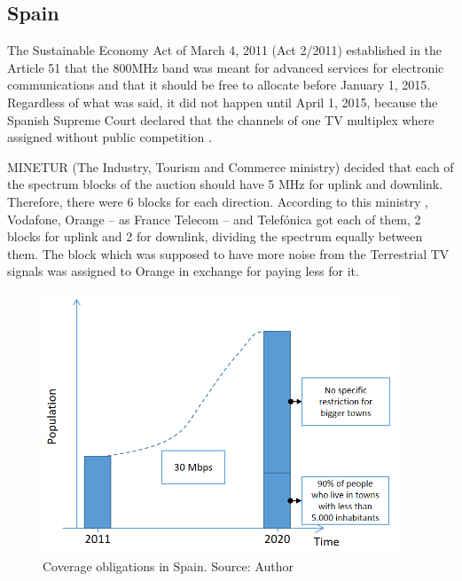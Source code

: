 {\subsection*{Spain}
The Sustainable Economy Act of March 4, 2011 (Act 2/2011) \cite{2-10} established in the Article 51 that the 800MHz band was meant for advanced services for electronic communications and that it should be free to allocate before January 1, 2015. Regardless of what was said, it did not happen until April 1, 2015, because the Spanish Supreme Court declared that the channels of one TV multiplex where assigned without public competition \cite{2-12}.\par

MINETUR (The Industry, Tourism and Commerce ministry) decided that each of the spectrum blocks of the auction should have 5 MHz for uplink and downlink. Therefore, there were 6 blocks for each direction. According to this ministry \cite{2-11}, Vodafone, Orange – as France Telecom – and Telefónica got each of them, 2 blocks for uplink and 2 for downlink, dividing the spectrum equally between them. The block which was supposed to have more noise from the Terrestrial TV signals was assigned to Orange in exchange for paying less for it.



\begin{figure}[H]
	\begin{Center}
		\includegraphics[width=0.95\textwidth]{./media/image9.png}
		\caption{Coverage obligations in Spain. Source: Author}
	\end{Center}
\end{figure}


}
